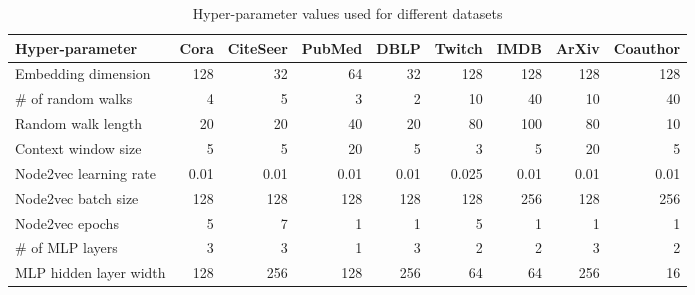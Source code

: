 \begin{table}
  \caption{Hyper-parameter values used for different datasets}
  \label{tab:hyperparameter-values}
  \centering
  \begin{adjustbox}{max width=\textwidth}
    \begin{tabular}{lrrrrrrrr}
      \toprule
      \textbf{Hyper-parameter} & \textbf{Cora} & \textbf{CiteSeer} & \textbf{PubMed} & \textbf{DBLP} & \textbf{Twitch} & \textbf{IMDB} & \textbf{ArXiv} & \textbf{Coauthor} \\
      \midrule
      Embedding dimension      & 128           & 32                & 64              & 32            & 128             & 128           & 128            & 128               \\
      \# of random walks       & 4             & 5                 & 3               & 2             & 10              & 40            & 10             & 40                \\
      Random walk length       & 20            & 20                & 40              & 20            & 80              & 100           & 80             & 10                \\
      Context window size      & 5             & 5                 & 20              & 5             & 3               & 5             & 20             & 5                 \\
      Node2vec learning rate   & 0.01          & 0.01              & 0.01            & 0.01          & 0.025           & 0.01          & 0.01           & 0.01              \\
      Node2vec batch size      & 128           & 128               & 128             & 128           & 128             & 256           & 128            & 256               \\
      Node2vec epochs          & 5             & 7                 & 1               & 1             & 5               & 1             & 1              & 1                 \\
      \# of MLP layers         & 3             & 3                 & 1               & 3             & 2               & 2             & 3              & 2                 \\
      MLP hidden layer width   & 128           & 256               & 128             & 256           & 64              & 64            & 256            & 16                \\

\end{tabular}
\end{adjustbox}
\end{table}
